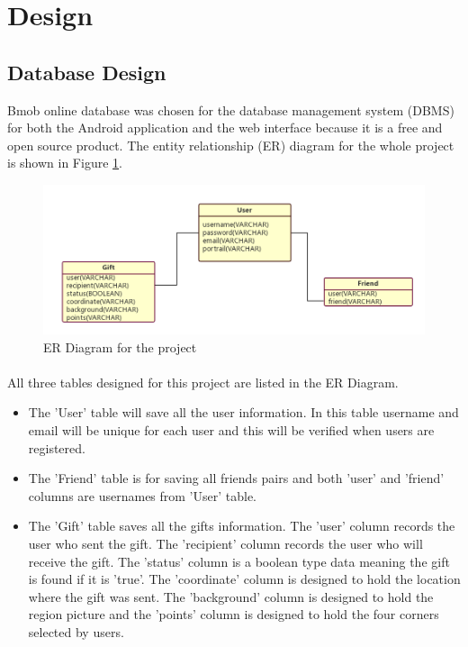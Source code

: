 \section{Design}
\label{sec:Design}

\subsection{Database Design} 
Bmob online database was chosen for the database management system (DBMS) for both the Android application and the web interface because it is a free and open source product. The entity relationship (ER) diagram for the whole project is shown in Figure \ref{ERDiagram}.

\begin{figure}[htb]
\centering
\includegraphics[width=.5\textwidth]{section03/assets/ERDiagram.png}
\caption[Short Caption 2]{\label{ERDiagram}ER Diagram for the project}
\end{figure}

\paragraph{}
All three tables designed for this project are listed in the ER Diagram.
\begin{itemize}
\item The 'User' table will save all the user information. In this table username and email will be unique for each user and this will be verified when users are registered.
\item The 'Friend' table is for saving all friends pairs and both 'user' and 'friend' columns are usernames from 'User' table.
\item The 'Gift' table saves all the gifts information. The 'user' column records the user who sent the gift. The 'recipient' column records the user who will receive the gift. The 'status' column is a boolean type data meaning the gift is found if it is 'true'. The 'coordinate' column is designed to hold the location where the gift was sent. The 'background' column is designed to hold the region picture and the 'points' column is designed to hold the four corners selected by users.
\end{itemize}

